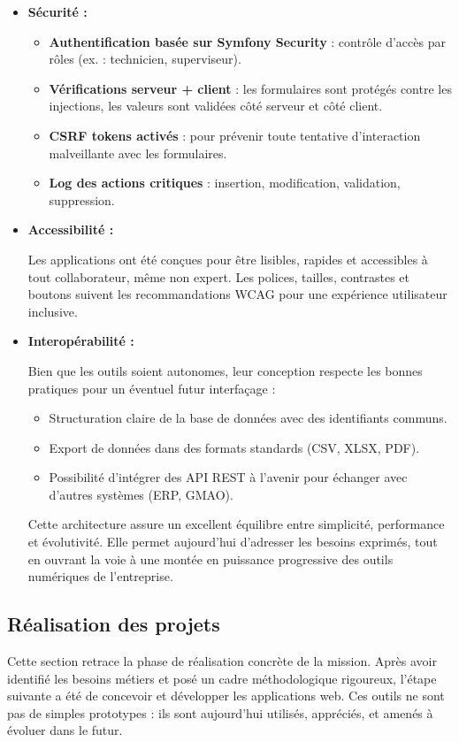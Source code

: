 \documentclass[11pt,a4paper]{article}
\begin{document}
\begin{itemize}
\item \textbf{ Sécurité :}

\begin{itemize}
    \item \textbf{Authentification basée sur Symfony Security} : contrôle d’accès par rôles (ex. : technicien, superviseur).
    \item \textbf{Vérifications serveur + client} : les formulaires sont protégés contre les injections, les valeurs sont validées côté serveur et côté client.
    \item \textbf{CSRF tokens activés} : pour prévenir toute tentative d’interaction malveillante avec les formulaires.
    \item \textbf{Log des actions critiques} : insertion, modification, validation, suppression.
\end{itemize}

\item \textbf{ Accessibilité :}

Les applications ont été conçues pour être lisibles, rapides et accessibles à tout collaborateur, même non expert. Les polices, tailles, contrastes et boutons suivent les recommandations WCAG pour une expérience utilisateur inclusive.

\item \textbf{ Interopérabilité :}

Bien que les outils soient autonomes, leur conception respecte les bonnes pratiques pour un éventuel futur interfaçage :

\begin{itemize}
    \item Structuration claire de la base de données avec des identifiants communs.
    \item Export de données dans des formats standards (CSV, XLSX, PDF).
    \item Possibilité d’intégrer des API REST à l’avenir pour échanger avec d’autres systèmes (ERP, GMAO).
\end{itemize}

Cette architecture assure un excellent équilibre entre simplicité, performance et évolutivité. Elle permet aujourd’hui d’adresser les besoins exprimés, tout en ouvrant la voie à une montée en puissance progressive des outils numériques de l’entreprise.

\end{itemize}

\subsection{Réalisation des projets}
Cette section retrace la phase de réalisation concrète de la mission. Après avoir identifié les besoins métiers et posé un cadre méthodologique rigoureux, l'étape suivante a été de concevoir et développer les applications web. Ces outils ne sont pas de simples prototypes : ils sont aujourd'hui utilisés, appréciés, et amenés à évoluer dans le futur.
\end{document}
